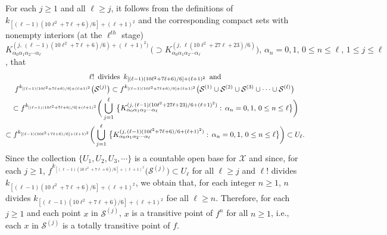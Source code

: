 \documentclass[12pt]{article}
\newcommand{\al}{\alpha}
\begin{document}
For each $j \ge 1$ and all $\ell \ge j$, it follows from the definitions of $k_{[(\ell-1)(10\ell^2+7\ell+6)/6]+(\ell+1)^2}$ and the corresponding compact sets with nonempty interiors (at the $\ell^{th}$ stage) $K_{\al_0\al_1\al_2\cdots\al_\ell}^{(j, \, (\ell-1)(10\ell^2+7\ell+6)/6)+(\ell+1)^2)} \, \big(\supset K_{\al_0\al_1\al_2\cdots\al_\ell}^{(j, \, \ell(10\ell^2+27\ell+23)/6)}\big), \, \al_n = 0, 1, \, 0 \le n \le \ell, \, 1 \le j \le \ell$, that
\begin{multline*}
$$
{\ell}! \,\,\, \text{divides} \,\,\, k_{[(\ell-1)(10\ell^2+7\ell+6)/6]+(\ell+1)^2} \,\,\, \text{and} \\ 
f^{k_{[(\ell-1)(10\ell^2+7\ell+6)/6]+(\ell+1)^2}}\big(\mathcal S^{(j)}\big) \subset f^{k_{[(\ell-1)(10\ell^2+7\ell+6)/6]+(\ell+1)^2}}\big(\mathcal S^{(1)} \cup \mathcal S^{(2)} \cup \mathcal S^{(3)} \cup \cdots \cup \mathcal S^{(\ell)} \big) \, \\
\,\, \subset f^{k_{[(\ell-1)(10\ell^2+7\ell+6)/6]+(\ell+1)^2}}\bigg(\bigcup_{j=1}^\ell \, \big\{ K_{\al_0\al_1\al_2\cdots\al_\ell}^{(j, \, (\ell-1)(10\ell^2+27\ell+23)/6+(\ell+1)^2)}: \, \al_n = 0, 1, \, 0 \le n \le \ell \big\}\bigg) \, \\
\subset f^{k_{[(\ell-1)(10\ell^2+7\ell+6)/6]+(\ell+1)^2}}\bigg(\bigcup_{j=1}^\ell \, \big\{ K_{\al_0\al_1\al_2\cdots\al_\ell}^{(j, \, (\ell-1)(10\ell^2+7\ell+6)/6+(\ell+1)^2)}: \, \al_n = 0, 1, \, 0 \le n \le \ell \big\}\bigg) \subset U_\ell.
$$  
\end{multline*}
\indent Since the collection $\{ U_1, U_2, U_3, \cdots \}$ is a countable open base for $\mathcal X$ and since, for each $j \ge 1$, $f^{k_{[(\ell-1)(10\ell^2+7\ell+6)/6]+(\ell+1)^2}}\big(\mathcal S^{(j)}\big) \subset U_\ell$ for all $\ell \ge j$ and ${\ell}!$ divides $k_{[(\ell-1)(10\ell^2+7\ell+6)/6]+(\ell+1)^2}$, we obtain that, for each integer $n \ge 1$, $n$ divides $k_{[(\ell-1)(10\ell^2+7\ell+6)/6]+(\ell+1)^2}$ foe all $\ell \ge n$.  Therefore, for each $j \ge 1$ and each point $x$ in $\mathcal S^{(j)}$, $x$ is a transitive point of $f^n$ for all $n \ge 1$, i.e., each $x$ in $\mathcal S^{(j)}$ is a totally transitive point of $f$.  
\end{document}
